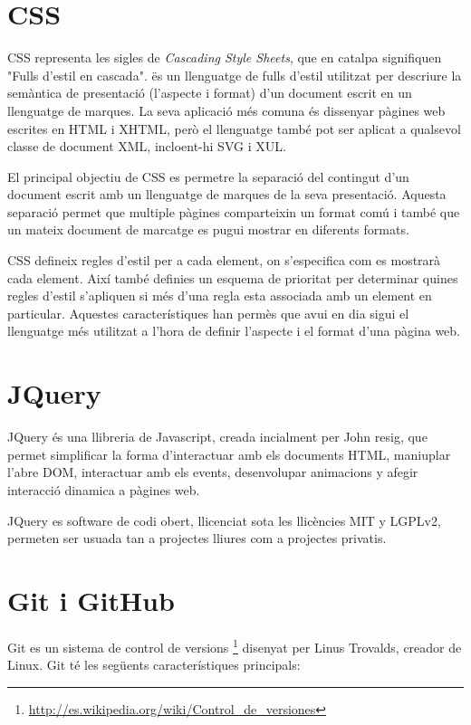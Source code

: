 \section{CSS}

CSS representa les sigles de \emph{Cascading Style Sheets}, que en catalpa signifiquen "Fulls d'estil en cascada". ës un llenguatge de fulls d'estil utilitzat per descriure la semàntica de presentació (l'aspecte i format) d'un document escrit en un llenguatge de marques. La seva aplicació més comuna és dissenyar pàgines web escrites en HTML i XHTML, però el llenguatge també pot ser aplicat a qualsevol classe de document XML, incloent-hi SVG i XUL.

El principal objectiu de CSS es permetre la separació del contingut d'un document escrit amb un llenguatge de marques de la seva presentació. Aquesta separació permet que multiple pàgines comparteixin un format comú i també que un mateix document de marcatge es pugui mostrar en diferents formats. 

CSS defineix regles d'estil per a cada element, on s'especifica com es mostrarà cada element. Així també definies un esquema de prioritat per determinar quines regles d'estil s'apliquen si més d'una regla esta associada amb un element en particular. Aquestes característiques han permès que avui en dia sigui el llenguatge més utilitzat a l'hora de definir l'aspecte i el format d'una pàgina web. 

\section{JQuery}

JQuery és una llibreria de Javascript, creada incialment per John resig, que permet simplificar la forma d'interactuar amb els documents HTML, maniuplar l'abre DOM, interactuar amb els events, desenvolupar animacions y afegir interacció dinamica a pàgines web. 

JQuery es software de codi obert, llicenciat sota les llicències MIT y LGPLv2, permeten ser usuada tan a projectes lliures com a projectes privatis. 

\section{Git i GitHub}

Git es un sistema de control de versions \footnote{\url{http://es.wikipedia.org/wiki/Control_de_versiones}} disenyat per Linus Trovalds, creador de Linux. Git té les següents característiques principals: 

